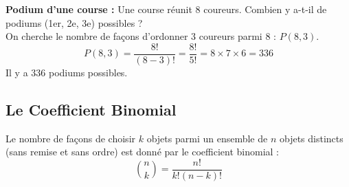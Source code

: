 \begin{examplebox}
\textbf{Podium d'une course :} Une course réunit 8 coureurs. Combien y a-t-il de podiums (1er, 2e, 3e) possibles ? \\
On cherche le nombre de façons d'ordonner 3 coureurs parmi 8 : $P(8, 3)$. 
$$ P(8, 3) = \frac{8!}{(8-3)!} = \frac{8!}{5!} = 8 \times 7 \times 6 = 336 $$
Il y a 336 podiums possibles.
\end{examplebox}

\subsection{Le Coefficient Binomial}

\begin{theorembox}
Le nombre de façons de choisir $k$ objets parmi un ensemble de $n$ objets distincts (sans remise et sans ordre) est donné par le coefficient binomial :
$$ \binom{n}{k} = \frac{n!}{k!(n-k)!} $$
\end{theorembox}

